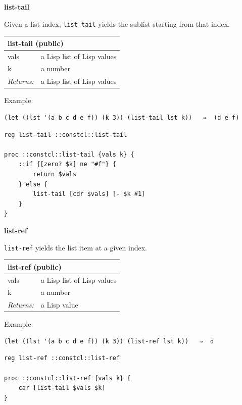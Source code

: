 \documentclass[twoside,9pt]{report}
\begin{document}
\textbf{list-tail}


Given a list index, \texttt{list-tail} yields the sublist starting from that index.

\begin{tabular}{ |l l| }
\hline
\multicolumn{2}{|l|}{list-tail (public)} \\
\hline
vals & a Lisp list of Lisp values \\
k & a number \\
\textit{Returns:} & a Lisp list of Lisp values \\
\hline
\end{tabular}


Example:

\noindent\makebox[\linewidth]{\rule{\linewidth}{0.4pt}}
\begin{lstlisting}
(let ((lst '(a b c d e f)) (k 3)) (list-tail lst k))   ⇒  (d e f)
\end{lstlisting}
\noindent\makebox[\linewidth]{\rule{\linewidth}{0.4pt}}
\noindent\makebox[\linewidth]{\rule{\linewidth}{0.4pt}}
\begin{lstlisting}
reg list-tail ::constcl::list-tail
 
proc ::constcl::list-tail {vals k} {
    ::if {[zero? $k] ne "#f"} {
        return $vals
    } else {
        list-tail [cdr $vals] [- $k #1]
    }
}
\end{lstlisting}
\noindent\makebox[\linewidth]{\rule{\linewidth}{0.4pt}}

\textbf{list-ref}


\texttt{list-ref} yields the list item at a given index.

\begin{tabular}{ |l l| }
\hline
\multicolumn{2}{|l|}{list-ref (public)} \\
\hline
vals & a Lisp list of Lisp values \\
k & a number \\
\textit{Returns:} & a Lisp value \\
\hline
\end{tabular}


Example:

\noindent\makebox[\linewidth]{\rule{\linewidth}{0.4pt}}
\begin{lstlisting}
(let ((lst '(a b c d e f)) (k 3)) (list-ref lst k))   ⇒  d
\end{lstlisting}
\noindent\makebox[\linewidth]{\rule{\linewidth}{0.4pt}}
\noindent\makebox[\linewidth]{\rule{\linewidth}{0.4pt}}
\begin{lstlisting}
reg list-ref ::constcl::list-ref
 
proc ::constcl::list-ref {vals k} {
    car [list-tail $vals $k]
}
\end{lstlisting}
\noindent\makebox[\linewidth]{\rule{\linewidth}{0.4pt}}
\end{document}
